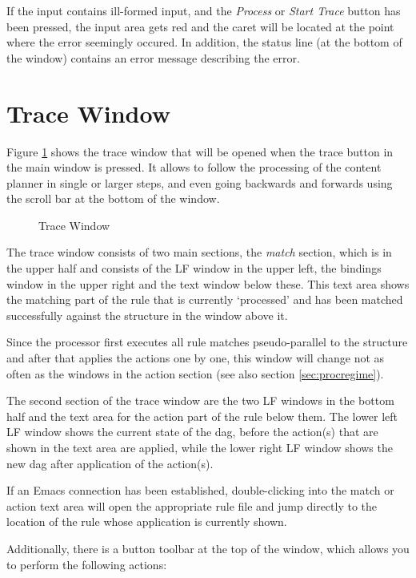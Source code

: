 \documentclass[11pt,a4paper]{report}
\begin{document}
If the input contains ill-formed input, and the \textit{Process} or
\textit{Start Trace} button has been pressed, the input area gets red and the
caret will be located at the point where the error seemingly occured. In
addition, the status line (at the bottom of the window) contains an error
message describing the error.

\section{Trace Window}

Figure \ref{fig:tracewindow} shows the trace window that will be opened when
the trace button in the main window is pressed. It allows to follow the
processing of the content planner in single or larger steps, and even going
backwards and forwards using the scroll bar at the bottom of the window.

\begin{figure}[htbp]
  \centering
  \caption{Trace Window}
  \label{fig:tracewindow}
\end{figure}

The trace window consists of two main sections, the \emph{match} section, which
is in the upper half and consists of the LF window in the upper left, the
bindings window in the upper right and the text window below these. This text
area shows the matching part of the rule that is currently `processed' and
has been matched successfully against the structure in the window above it.

Since the processor first executes all rule matches pseudo-parallel to the
structure and after that applies the actions one by one, this window will
change not as often as the windows in the action section (see also section
\ref{sec:procregime}).

The second section of the trace window are the two LF windows in the bottom half
and the text area for the action part of the rule below them. The lower left LF
window shows the current state of the dag, before the action(s) that are shown
in the text area are applied, while the lower right LF window shows the new dag
after application of the action(s).

If an Emacs connection has been established, double-clicking into the match
or action text area will open the appropriate rule file and jump directly to
the location of the rule whose application is currently shown.

Additionally, there is a button toolbar at the top of the window, which allows
you to perform the following actions:
\end{document}
